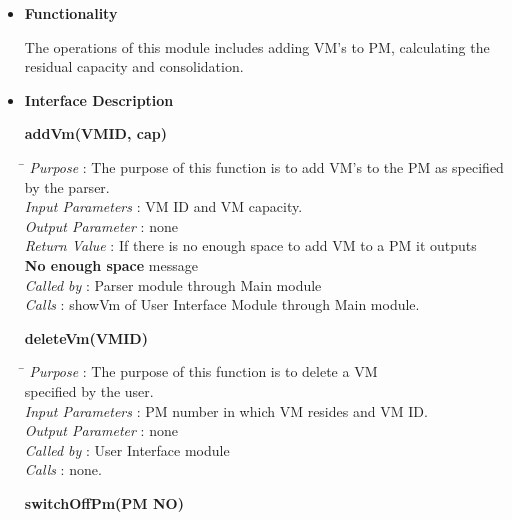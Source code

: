 \documentclass[a4paper,11pt]{article}
\begin{document}
\begin{itemize}
\item \textbf{Functionality}

The operations of this module includes adding VM's to PM, calculating the residual capacity and consolidation.

\item \textbf{Interface Description}


\textbf{addVm(VM\textunderscore ID, cap)}
  
\begin{tabbing}
\hspace*{4cm}\= \kill
 \textit{Purpose} \> : The purpose of this function is to add VM's to the PM as specified\\ \> by the parser.\\
  \textit{Input Parameters} \> : VM ID and VM capacity. \\
  \textit{Output Parameter} \> : none \\
  \textit{Return Value} \> : If there is no enough space to add VM to a PM it outputs \\ \>\textbf{No enough space} message\\
  \textit{Called by} \> : Parser module through Main module \\
  \textit{Calls} \> : showVm of User Interface Module through Main module.\\
\end{tabbing}
\pagebreak
\textbf{deleteVm(VM\textunderscore ID)}
  
\begin{tabbing}
\hspace*{4cm}\= \kill
 \textit{Purpose} \> : The purpose of this function is to delete a VM \\ \>specified by the user.\\
  \textit{Input Parameters} \> : PM number in which VM resides and VM ID. \\
  \textit{Output Parameter} \> : none \\
 \textit{Called by} \> : User Interface module \\
  \textit{Calls} \> : none.\\
\end{tabbing}
\pagebreak
\textbf{switchOffPm(PM \textunderscore NO)}
  

\end{itemize}
\end{document}
